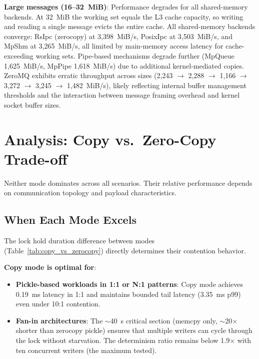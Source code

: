\textbf{Large messages (16--32~MiB)}: Performance degrades for all shared-memory backends. At 32~MiB the working set equals the L3 cache capacity, so writing and reading a single message evicts the entire cache. All shared-memory backends converge: RsIpc (zerocopy) at 3,398~MiB/s, PosixIpc at 3,503~MiB/s, and MpShm at 3,265~MiB/s, all limited by main-memory access latency for cache-exceeding working sets. Pipe-based mechanisms degrade further (MpQueue 1,625~MiB/s, MpPipe 1,618~MiB/s) due to additional kernel-mediated copies. ZeroMQ exhibits erratic throughput across sizes (2,243 $\rightarrow$ 2,288 $\rightarrow$ 1,166 $\rightarrow$ 3,272 $\rightarrow$ 3,245 $\rightarrow$ 1,482~MiB/s), likely reflecting internal buffer management thresholds and the interaction between message framing overhead and kernel socket buffer sizes.


\newpage
\section{Analysis: Copy vs.\ Zero-Copy Trade-off}
\label{sec:copy_vs_zerocopy}

Neither mode dominates across all scenarios. Their relative performance depends on communication topology and payload characteristics.

\subsection{When Each Mode Excels}

The lock hold duration difference between modes (Table~\ref{tab:copy_vs_zerocopy}) directly determines their contention behavior.

\textbf{Copy mode is optimal for}:
\begin{itemize}
    \item \textbf{Pickle-based workloads in 1:1 or N:1 patterns}: Copy mode achieves 0.19~ms latency in 1:1 and maintains bounded tail latency (3.35~ms p99) even under 10:1 contention.
    \item \textbf{Fan-in architectures}: The $\sim$40~\textmu s critical section (memcpy only, $\sim$20$\times$ shorter than zerocopy pickle) ensures that multiple writers can cycle through the lock without starvation. The determinism ratio remains below 1.9$\times$ with ten concurrent writers (the maximum tested).
\end{itemize}

